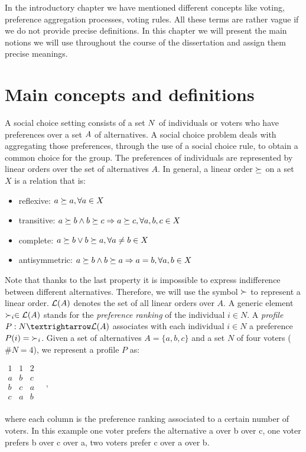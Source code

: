 
In the introductory chapter we have mentioned different concepts like voting, preference aggregation processes, voting rules. All these terms are rather vague if we do not provide precise definitions.
In this chapter we will present the main notions we will use throughout the course of the dissertation and assign them precise meanings.

\section{Main concepts and definitions}

A social choice setting consists of a set $N$ of individuals \textemdash or voters \textemdash who have preferences over a set $A$ of alternatives.
A social choice problem deals with aggregating those preferences, through the use of a social choice rule, to obtain a common choice for the group.
The preferences of individuals are represented by linear orders over the set of alternatives $A$.
In general, a linear order $\succeq$ on a set $X$ is a relation that is:
\vspace{-0.6em}
\begin{itemize}
	\itemsep-0.5em 
	\item reflexive: $a \succeq a, \forall a \in X$
	\item transitive: $a \succeq b \land b \succeq c \Rightarrow a \succeq c, \forall a,b,c \in X$
	\item complete: $a \succeq b \lor b \succeq a, \forall a \neq b \in X$
	\item antisymmetric: $a \succeq b \land b \succeq a \Rightarrow a = b, \forall a,b \in X$
\end{itemize} 
\vspace{-0.6em}
Note that thanks to the last property it is impossible to express indifference between different alternatives. Therefore, we will use the symbol $\succ$ to represent a linear order.
$\mathcal{L}(A)$ denotes the set of all linear orders over $A$. A generic element $\prefi \in \linors$ stands for the \textit{preference ranking} of the individual $i\in N$.
A \emph{profile} $\prof: N → \linors$ associates with each individual $i \in N$ a preference $\prof(i) = {\prefi}$.
Given a set of alternatives $A=\{a,b,c\}$ and a set $N$ of four voters ($\#N=4$), we represent a profile $P$ as:
\begin{center}
	$
	\begin{array}{ccc}
		1 & 1 & 2 \\
		a &	b & c \\
		b &	c & a  \\
		c &	a & b  \\
	\end{array} \quad, 
	$
\end{center}
where each column is the preference ranking associated to a certain number of voters. In this example one voter prefers the alternative a over b over c, one voter prefers b over c over a, two voters prefer c over a over b.

